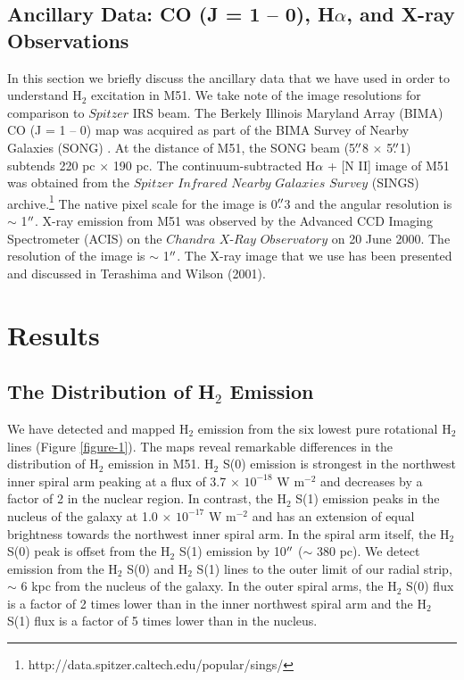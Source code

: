 \documentclass[manuscript]{aastex}
\begin{document}
\subsection{Ancillary Data: CO (J = 1 -- 0), H$\alpha$, and X-ray Observations}

In this section we briefly discuss the ancillary data that we 
have used in order to understand H$_2$ excitation in M51.  
We take note of the image resolutions for comparison to 
$Spitzer$ IRS beam.  The Berkely Illinois Maryland Array (BIMA) CO (J = 1 -- 0) map was
acquired as part of the BIMA Survey of Nearby Galaxies (SONG)
\citep{reg01, hel03}.  At the distance of M51, the SONG beam
(5$\mbox{$.\!\!^{\prime\prime}$}$8 $\times$ 5$\mbox{$.\!\!^{\prime\prime}$}$1) subtends 220 pc $\times$ 190 pc.  
The continuum-subtracted H$\alpha$ + [N II] image of M51 was obtained from the
$Spitzer$ $Infrared$ $Nearby$ $Galaxies$ $Survey$ (SINGS) archive.\footnote{http://data.spitzer.caltech.edu/popular/sings/} 
The native pixel scale for the image is 0$\mbox{$.\!\!^{\prime\prime}$}$3 
and the angular resolution is $\sim$ 1$\mbox{$^{\prime\prime}$}$.  X-ray 
emission from M51 was observed by the Advanced CCD 
Imaging Spectrometer (ACIS) on the $Chandra$ $X$-$Ray$ 
$Observatory$ on 20 June 2000.  The resolution of 
the image is $\sim$ 1$\mbox{$^{\prime\prime}$}$.  The X-ray image that 
we use has been presented and discussed in 
Terashima and Wilson (2001).

\section{Results}

\subsection{The Distribution of H$_2$ Emission}

We have detected and mapped $\mathrm{H_2}$ emission from the six
lowest pure rotational $\mathrm{H_2}$ lines (Figure \ref{figure-1}).  The
maps reveal remarkable differences in the distribution of
$\mathrm{H_2}$ emission in M51.  $\mathrm{H_2}$ S(0) emission is
strongest in the northwest inner spiral arm peaking at a flux of 3.7
$\times$ $\mathrm{10^{-18}}$ W $\mathrm{m^{-2}}$ and decreases by a
factor of 2 in the nuclear region.  In contrast, the $\mathrm{H_2}$
S(1) emission peaks in the nucleus of the galaxy at
1.0 $\times$ $\mathrm{10^{-17}}$ W $\mathrm{m^{-2}}$ and has an
extension of equal brightness towards the northwest inner spiral arm.  In the
spiral arm itself, the $\mathrm{H_2}$ S(0) peak is offset from the
$\mathrm{H_2}$ S(1) emission by 10$\mbox{$^{\prime\prime}$}$ ($\sim$ 380 pc).  
We detect emission from the $\mathrm{H_2}$ S(0) and 
$\mathrm{H_2}$ S(1) lines to the outer limit of our radial 
strip,  $\sim$ 6 kpc from the nucleus of the galaxy.  In the outer spiral arms,
the $\mathrm{H_2}$ S(0) flux is a factor of 2 times lower than in
the inner northwest spiral arm and the $\mathrm{H_2}$ S(1) flux
is a factor of 5 times lower than in the nucleus.
 
\end{document}
